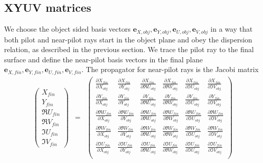 \documentclass[12pt,a4paper,twoside,openright,BCOR10mm,headsepline,titlepage,abstracton,chapterprefix,final]{scrreprt}
\newcommand\Vector[1]{{\mathbf{#1}}}
\begin{document}
\subsection{XYUV matrices}
We choose the object sided basis vectors $\Vector{e}_{X,obj}, \Vector{e}_{Y,obj}, \Vector{e}_{U,obj}, \Vector{e}_{V,obj}$ 
in a way that both pilot and near-pilot rays start in the object plane and obey the dispersion relation, 
as described in the previous section.
We trace the pilot ray to the final surface 
and define the near-pilot basis vectors in the final plane $\Vector{e}_{X,fin}, \Vector{e}_{Y,fin}, \Vector{e}_{U,fin}, \Vector{e}_{V,fin}$.
The propagator for near-pilot rays is the Jacobi matrix
\begin{eqnarray}
 \begin{pmatrix}
  X_{fin} \\[2ex] Y_{fin} \\[2ex] \Re U_{fin}\\[2ex] \Re V_{fin} \\[2ex] \Im U_{fin} \\[2ex] \Im V_{fin} 
 \end{pmatrix}
 &=&
 \begin{pmatrix}
  \frac{\partial X_{fin}}{\partial X_{obj}} & \frac{\partial X_{fin}}{\partial Y_{obj}} & \frac{\partial X_{fin}}{\partial \Re U_{obj}} & \frac{\partial X_{fin}}{\partial \Re V_{obj}} & \frac{\partial X_{fin}}{\partial \Im U_{obj}} & \frac{\partial X_{fin}}{\partial \Im V_{obj}} \\[2ex]
  \frac{\partial Y_{fin}}{\partial X_{obj}} & \frac{\partial Y_{fin}}{\partial Y_{obj}} & \frac{\partial Y_{fin}}{\partial \Re U_{obj}} & \frac{\partial Y_{fin}}{\partial \Re V_{obj}} & \frac{\partial Y_{fin}}{\partial \Im U_{obj}} & \frac{\partial Y_{fin}}{\partial \Im V_{obj}} \\[2ex]
  \frac{\partial \Re U_{fin}}{\partial X_{obj}} & \frac{\partial \Re U_{fin}}{\partial Y_{obj}} & \frac{\partial \Re U_{fin}}{\partial \Re U_{obj}} & \frac{\partial \Re U_{fin}}{\partial \Re V_{obj}} & \frac{\partial \Re U_{fin}}{\partial \Im U_{obj}} & \frac{\partial \Re U_{fin}}{\partial \Im V_{obj}} \\[2ex]
  \frac{\partial \Re V_{fin}}{\partial X_{obj}} & \frac{\partial \Re V_{fin}}{\partial Y_{obj}} & \frac{\partial \Re V_{fin}}{\partial \Re U_{obj}} & \frac{\partial \Re V_{fin}}{\partial \Re V_{obj}} & \frac{\partial \Re V_{fin}}{\partial \Im U_{obj}} & \frac{\partial \Re V_{fin}}{\partial \Im V_{obj}} \\[2ex]
  \frac{\partial \Im U_{fin}}{\partial X_{obj}} & \frac{\partial \Im U_{fin}}{\partial Y_{obj}} & \frac{\partial \Im U_{fin}}{\partial \Re U_{obj}} & \frac{\partial \Im U_{fin}}{\partial \Re V_{obj}} & \frac{\partial \Im U_{fin}}{\partial \Im U_{obj}} & \frac{\partial \Im U_{fin}}{\partial \Im V_{obj}} \\[2ex]

\end{pmatrix}
\end{eqnarray}
\end{document}
